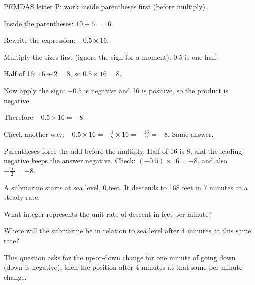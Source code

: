 \begin{steps}
  \item PEMDAS letter P: work inside parentheses first (before multiply).
  \item Inside the parentheses: $10 + 6 = 16$.
  \item Rewrite the expression: $-0.5 \times 16$.
  \item Multiply the sizes first (ignore the sign for a moment): 0.5 is one half.
  \item Half of 16: $16 \div 2 = 8$, so $0.5 \times 16 = 8$.
  \item Now apply the sign: $-0.5$ is negative and 16 is positive, so the product is negative.
  \item Therefore $-0.5 \times 16 = -8$.
  \item Check another way: $-0.5 \times 16 = -\frac{1}{2} \times 16 = -\frac{16}{2} = -8$. Same answer.
\end{steps}


\noindent Parentheses force the add before the multiply. Half of 16 is 8, and the leading negative keeps the answer negative. Check: $(-0.5) \times 16 = -8$, and also $-\frac{16}{2} = -8$.




\noindent A submarine starts at sea level, 0 feet. It descends to 168 feet in 7 minutes at a steady rate.

\par\noindent{}What integer represents the unit rate of descent in feet per minute?

\par\noindent{}Where will the submarine be in relation to sea level after 4 minutes at this same rate?


\noindent This question asks for the up-or-down change for one minute of going down (down is negative), then the position after 4 minutes at that same per-minute change.

